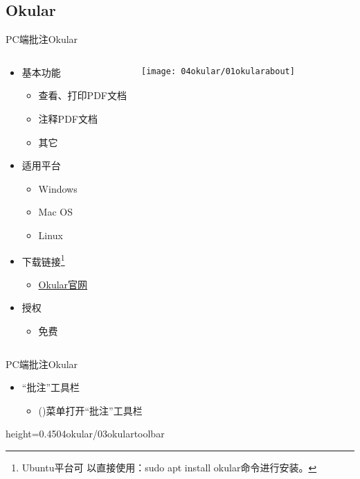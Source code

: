 \documentclass[fontset = none, t, aspectratio=169]{ctexbeamer}
\begin{document}
\subsection{Okular}
\begin{frame}{PC端批注}{Okular}
  \begin{columns}[c,onlytextwidth]
    \begin{spacing}{1.2}
    \begin{itemize}
    \item 基本功能
      \begin{itemize}
      \item 查看、打印PDF文档
      \item \alert{注释}PDF文档
      \item 其它
      \end{itemize}
    \item 适用平台
      \begin{itemize}
      \item Windows
      \item Mac OS
      \item Linux
      \end{itemize}
    \item 下载链接\footnote[frame,1]{Ubuntu平台可
            以直接使用：sudo apt install okular命令进行安装。}
      \begin{itemize}
      \item \href{https://okular.kde.org/}{Okular官网}
      \end{itemize}
    \item 授权
      \begin{itemize}
      \item \alert{免费}
      \end{itemize}
    \end{itemize}
    \end{spacing}
    \centering
    \texttt{[image: 04okular/01okularabout]}
  \end{columns}
\end{frame}

\begin{frame}{PC端批注}{Okular}
  \begin{itemize}
  \item \enquote{批注}工具栏
    \begin{itemize}
      \item {}()菜单打开\enquote{批注}工具栏
    \end{itemize}
  \end{itemize}
  \begin{center}
    \begin{annotationimage}{height=0.45\textheight}{04okular/03okulartoolbar}
    \end{annotationimage}
  \end{center}
\end{frame}
\end{document}

